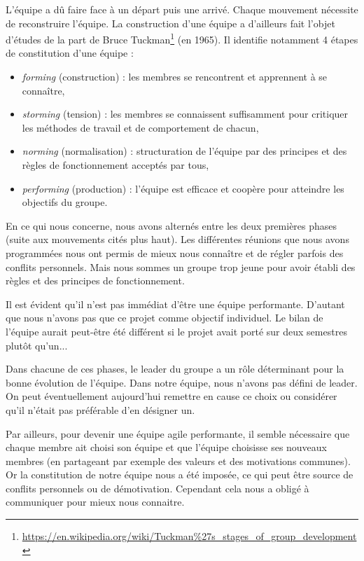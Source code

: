 \documentclass[a4paper,12pt]{article}
\begin{document}
L'équipe a dû faire face à un départ puis une arrivé. Chaque mouvement nécessite de reconstruire l'équipe. 
La construction d'une équipe a d'ailleurs fait l'objet d'études de la part de Bruce Tuckman\footnote{\url{https://en.wikipedia.org/wiki/Tuckman\%27s_stages_of_group_development}} (en 1965). Il identifie notamment 4 étapes de constitution d'une équipe :
\begin{itemize}
\item \emph{forming} (construction) : les membres se rencontrent et apprennent à se connaître,
\item \emph{storming} (tension) : les membres se connaissent suffisamment pour critiquer les méthodes de travail et de comportement de chacun,
\item \emph{norming} (normalisation) : structuration de l'équipe par des principes et des règles de fonctionnement acceptés par tous,
\item \emph{performing} (production) : l'équipe est efficace et coopère pour atteindre les objectifs du groupe.
\end{itemize}
En ce qui nous concerne, nous avons alternés entre les deux premières phases (suite aux mouvements cités plus haut). Les différentes réunions que nous avons programmées nous ont permis de mieux nous connaître et de régler parfois des conflits personnels. Mais nous sommes un groupe trop jeune pour avoir établi des règles et des principes de fonctionnement.

Il est évident qu'il n'est pas immédiat d'être une équipe performante. D'autant que nous n'avons pas que ce projet comme objectif individuel.
Le bilan de l'équipe aurait peut-être été différent si le projet avait porté sur deux semestres plutôt qu'un...

Dans chacune de ces phases, le leader du groupe a un rôle déterminant pour la bonne évolution de l'équipe.
Dans notre équipe, nous n'avons pas défini de leader. On peut éventuellement aujourd'hui remettre en cause ce choix ou considérer qu'il n'était pas préférable d'en désigner un. 


Par ailleurs, pour devenir une équipe agile performante, il semble nécessaire que chaque membre ait choisi son équipe et que l'équipe choisisse ses nouveaux membres (en partageant par exemple des valeurs et des motivations communes). Or la constitution de notre équipe nous a été imposée, ce qui peut être source de conflits personnels ou de démotivation. Cependant cela nous a obligé à communiquer pour mieux nous connaitre.
\end{document}
